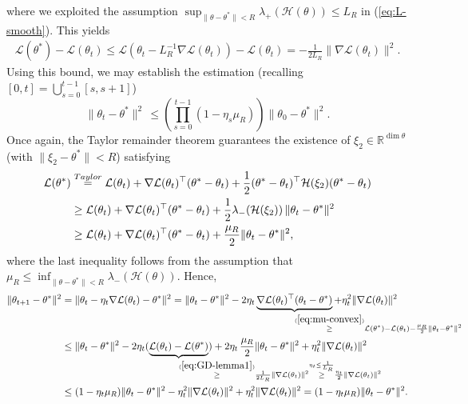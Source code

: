 \documentclass{article}
\begin{document}
where we exploited the assumption $\sup_{\|\theta-\theta^*\|< R}\lambda_+(\mathcal{H}(\theta))\leq L_R$ in (\ref{eq:L-smooth}). This yields
\begin{align}
\mathcal{L}(\theta^*)-\mathcal{L}(\theta_t)\leq\mathcal{L}(\theta_t-L_R^{-1}\nabla\mathcal{L}(\theta_t))-\mathcal{L}(\theta_t)=-\frac{1}{2L_R}\|\nabla\mathcal{L}(\theta_t)\|^2.
\end{align}
Using this bound, we may establish the estimation (recalling $[0,t]=\bigcup_{s=0}^{t-1}[s,s+1]$)
\begin{equation}
\|\theta_t-\theta^*\|^2\,\leq\left(\prod_{s=0}^{t-1}(1-\eta_s\mu_R)\right)\|\theta_0-\theta^*\|^2.\label{eq:GD-lemma2}
\end{equation}
Once again, the Taylor remainder theorem guarantees the existence of $\xi_2\in\mathbb{R}^{\dim\theta}$ (with $\|\xi_2-\theta^*\|< R$) satisfying
\begin{align}
\mathcal{L}(\theta^*) &\stackrel{Taylor}{=} \mathcal{L}(\theta_t)+\nabla\mathcal{L}(\theta_t)^\top(\theta^*-\theta_t)+\frac{1}{2}(\theta^*-\theta_t)^\top\mathcal{H}(\xi_2)(\theta^*-\theta_t) \notag
\\ &\geq \mathcal{L}(\theta_t)+\nabla\mathcal{L}(\theta_t)^\top(\theta^*-\theta_t)+\frac{1}{2}\lambda_-(\mathcal{H}(\xi_2))\,\|\theta_t-\theta^*\|^2 \notag
\\ &\geq \mathcal{L}(\theta_t)+\nabla\mathcal{L}(\theta_t)^\top(\theta^*-\theta_t)+\frac{\mu_R}{2}\|\theta_t-\theta^*\|^2,\label{eq:mu-convex}
\end{align}
where the last inequality follows from the assumption that $\mu_R\leq\inf_{\|\theta-\theta^*\|< R}\lambda_-(\mathcal{H}(\theta))$. Hence,
\begin{align}
\|\theta_{t+1}-\theta^*\|^2 &= \|\theta_t-\eta_t\nabla\mathcal{L}(\theta_t)-\theta^*\|^2=\|\theta_t-\theta^*\|^2-2\eta_t\underbrace{\nabla\mathcal{L}(\theta_t)^\top(\theta_t-\theta^*)}_{\mathrlap{\stackrel{(\ref{eq:mu-convex})}\geq\mathcal{L}(\theta^*)-\mathcal{L}(\theta_t)-\frac{\mu_R}{2}\|\theta_t-\theta^*\|^2}}+\eta_t^2\|\nabla\mathcal{L}(\theta_t)\|^2 \notag
\\ &\leq \|\theta_t-\theta^*\|^2-2\eta_t(\underbrace{\mathcal{L}(\theta_t)-\mathcal{L}(\theta^*)}_{\mathrlap{\stackrel{(\ref{eq:GD-lemma1})}{\geq}\frac{1}{2L_R}\|\nabla\mathcal{L}(\theta_t)\|^2\stackrel{\eta_t\leq\frac{1}{L_R}}{\geq}\frac{\eta_t}{2}\|\nabla\mathcal{L}(\theta_t)\|^2}})+2\eta_t\,\frac{\mu_R}{2}\|\theta_t-\theta^*\|^2+\eta_t^2\|\nabla\mathcal{L}(\theta_t)\|^2 \notag
\\ &\leq (1-\eta_t\mu_R)\|\theta_t-\theta^*\|^2-\eta_t^2\|\nabla\mathcal{L}(\theta_t)\|^2+\eta_t^2\|\nabla\mathcal{L}(\theta_t)\|^2=(1-\eta_t\mu_R)\|\theta_t-\theta^*\|^2.
\end{align}
\end{document}
